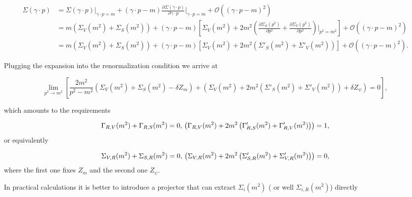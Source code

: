 \documentclass[../FeynCalcManual.tex]{subfiles}
\begin{document}
\begin{align*}
    \Sigma (\gamma \cdot p) & =  \Sigma (\gamma \cdot p) \biggl|_{\gamma \cdot p=m} + (\gamma \cdot p-m) \frac{ \partial \Sigma (\gamma \cdot p)}{\partial \gamma \cdot p } \biggl|_{\gamma \cdot p=m} + \mathcal{O} ((\gamma \cdot p-m)^2) \\
    & =   m (\Sigma_V(m^2) + \Sigma_S(m^2) ) +   (\gamma \cdot p - m) \left [ \Sigma_V(m^2) + 2 m^2 \left ( \frac{\partial \Sigma_S (p^2) }{\partial p^2}  + \frac{\partial \Sigma_V (p^2) }{\partial p^2}  \right )\biggl|_{p^2 = m^2} \right ] + \mathcal{O} ((\gamma \cdot p-m)^2) \\
    & =   m (\Sigma_V(m^2) + \Sigma_S(m^2) ) +   (\gamma \cdot p - m) \left [ \Sigma_V(m^2) + 2 m^2 \left ( \Sigma'_S (m^2) + \Sigma'_V (m^2)  \right ) \right ] + \mathcal{O} ((\gamma \cdot p-m)^2).
\end{align*}

Plugging the expansion into the renormalization condition we arrive at

\begin{equation}
    \lim_{p^2 \to m^2} \left [ \frac{2m^2}{p^2-m^2} (\Sigma_V(m^2) + \Sigma_S(m^2) - \delta Z_m) + 
    \left ( \Sigma_V(m^2) + 2 m^2 \left ( \Sigma'_S (m^2) + \Sigma'_V (m^2)  \right) + \delta Z_\psi \right ) = 0 \right ],
\end{equation}

which amounts to the requirements

\begin{equation}
        \Gamma_{R,V}(m^2) + \Gamma_{R,S}(m^2)  = 0, \\
        \left ( \Gamma_{R,V}(m^2) + 2 m^2 \left ( \Gamma'_{R,S} (m^2) + \Gamma'_{R,V} (m^2)  \right) \right ) = 1,
\end{equation} or equivalently

\begin{equation}
         \Sigma_{V,R}(m^2) + \Sigma_{S,R}(m^2)  = 0, \\
        \left ( \Sigma_{V,R}(m^2) + 2 m^2 \left ( \Sigma'_{S,R} (m^2) + \Sigma'_{V,R} (m^2)  \right) \right ) = 0,
\end{equation} where the first one fixes \(Z_m\) and the second one
\(Z_\psi\).

In practical calculations it is better to introduce a projector that can
extract \(\Sigma_i(m^2)\) ( or well \(\Sigma_{i,R}(m^2)\)) directly
\end{document}
